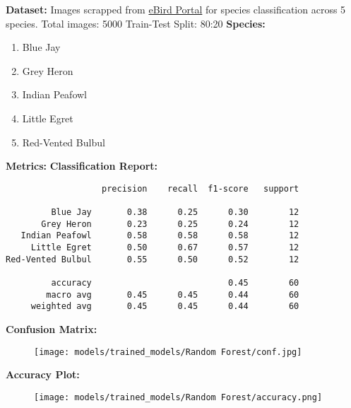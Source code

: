 \documentclass{article}
\begin{document}
\noindent \textbf{Dataset:}
Images scrapped from \href{https://ebird.org/explore}{eBird Portal}  for species classification across 5 species.
\newline
Total images: 5000
\newline
Train-Test Split: 80:20
\newline
\newline
\noindent \textbf{Species:}
\begin{enumerate}[noitemsep]
  \item Blue Jay
  \item Grey Heron
  \item Indian Peafowl
  \item Little Egret
  \item Red-Vented Bulbul
\end{enumerate}
\vspace{5mm}
\noindent \textbf{Metrics:}
\newline
\newline
\noindent \textbf{Classification Report:}

\begin{verbatim}                   precision    recall  f1-score   support

         Blue Jay       0.38      0.25      0.30        12
       Grey Heron       0.23      0.25      0.24        12
   Indian Peafowl       0.58      0.58      0.58        12
     Little Egret       0.50      0.67      0.57        12
Red-Vented Bulbul       0.55      0.50      0.52        12

         accuracy                           0.45        60
        macro avg       0.45      0.45      0.44        60
     weighted avg       0.45      0.45      0.44        60
\end{verbatim}
\newpage
\noindent \textbf{Confusion Matrix:}

\begin{figure}[h!]
\centering
\texttt{[image: models/trained\_models/Random Forest/conf.jpg]}
\end{figure}
\noindent \textbf{Accuracy Plot:}
\begin{figure}[h!]
\centering
\texttt{[image: models/trained\_models/Random Forest/accuracy.png]}
\end{figure}
\end{document}
